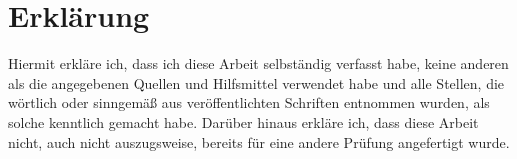 \section*{Erklärung}


Hiermit erkläre ich, dass ich diese Arbeit selbständig verfasst
habe, keine anderen als die angegebenen Quellen und Hilfsmittel verwendet
habe und alle Stellen, die wörtlich oder sinngemäß aus veröffentlichten
Schriften entnommen wurden, als solche kenntlich gemacht habe. Darüber
hinaus erkläre ich, dass diese Arbeit nicht, auch nicht auszugsweise,
bereits für eine andere Prüfung angefertigt wurde.
